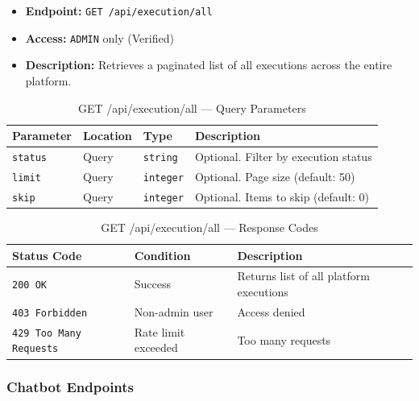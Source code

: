 \begin{itemize}
  \item \textbf{Endpoint:} \texttt{GET /api/execution/all}
  \item \textbf{Access:} \texttt{ADMIN} only (Verified)
  \item \textbf{Description:} Retrieves a paginated list of all executions across the entire platform.
\end{itemize}

\begin{table}[H]
\centering
\renewcommand{\arraystretch}{1.3}
\begin{tabularx}{\textwidth}{|l|l|l|X|}
\hline
\textbf{Parameter} & \textbf{Location} & \textbf{Type} & \textbf{Description} \\
\hline
\texttt{status} & Query & \texttt{string} & Optional. Filter by execution status \\
\hline
\texttt{limit}  & Query & \texttt{integer} & Optional. Page size (default: 50) \\
\hline
\texttt{skip}   & Query & \texttt{integer} & Optional. Items to skip (default: 0) \\
\hline
\end{tabularx}
\caption{GET /api/execution/all — Query Parameters}
\label{tab:get-all-platform-executions-params}
\end{table}

\begin{table}[H]
\centering
\renewcommand{\arraystretch}{1.3}
\begin{tabularx}{\textwidth}{|l|l|X|}
\hline
\textbf{Status Code} & \textbf{Condition} & \textbf{Description} \\
\hline
\texttt{200 OK}           & Success            & Returns list of all platform executions \\
\hline
\texttt{403 Forbidden}    & Non-admin user     & Access denied \\
\hline
\texttt{429 Too Many Requests} & Rate limit exceeded & Too many requests \\
\hline
\end{tabularx}
\caption{GET /api/execution/all — Response Codes}
\label{tab:get-all-platform-executions-responses}
\end{table}
\FloatBarrier
\subsubsection{Chatbot Endpoints}
\label{subsec:chatbot-endpoints}

